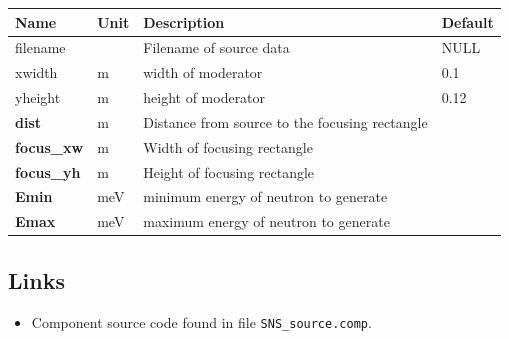\begin{longtable}{p{}p{}p{}p{}}
\toprule
\textbf{Name} & \textbf{Unit} & \textbf{Description} & \textbf{Default} \\
\midrule
\endhead
filename &  & Filename of source data & NULL \\
xwidth & m & width of moderator & 0.1 \\
yheight & m & height of moderator & 0.12 \\
\textbf{dist} & m & Distance from source to the focusing rectangle &  \\
\textbf{focus\_xw} & m & Width of focusing rectangle &  \\
\textbf{focus\_yh} & m & Height of focusing rectangle &  \\
\textbf{Emin} & meV & minimum energy of neutron to generate &  \\
\textbf{Emax} & meV & maximum energy of neutron to generate &  \\
\bottomrule
\end{longtable}

\subsection*{Links}
\begin{itemize}
  \item Component source code found in file \texttt{SNS\_source.comp}.
\end{itemize}
